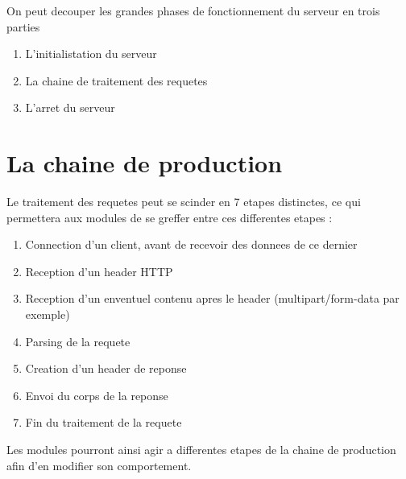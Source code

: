 On peut decouper les grandes phases de fonctionnement du serveur en trois parties

\begin{enumerate}
    \item L'initialistation du serveur
    \item La chaine de traitement des requetes
    \item L'arret du serveur
\end{enumerate}

\section{La chaine de production}
Le traitement des requetes peut se scinder en 7 etapes distinctes, ce qui permettera aux modules de se greffer entre ces differentes etapes :
        \begin{enumerate}
            \item Connection d'un client, avant de recevoir des donnees de ce dernier
            \item Reception d'un header HTTP
            \item Reception d'un enventuel contenu apres le header (multipart/form-data par exemple)
            \item Parsing de la requete
            \item Creation d'un header de reponse
            \item Envoi du corps de la reponse
            \item Fin du traitement de la requete
        \end{enumerate}

        Les modules pourront ainsi agir a differentes etapes de la chaine de production afin d'en modifier son comportement.
 
